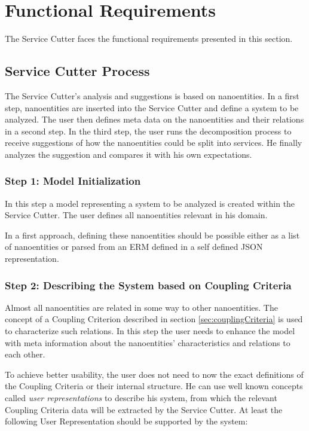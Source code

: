 \section{Functional Requirements}

The Service Cutter faces the functional requirements presented in this
section.


\subsection{Service Cutter Process}

The Service Cutter's analysis and suggestions is based on nanoentities. In a first step, nanoentities are inserted into the Service Cutter and define a system to be analyzed. The user then defines meta data on the nanoentities and their relations in a second step. In the third step, the user runs the decomposition process to receive suggestions of how the nanoentities could be split into services. He finally analyzes the suggestion and compares it with his own expectations. 

\subsubsection{Step 1: Model Initialization}

In this step a model representing a system to be analyzed is created within the Service Cutter. The user defines all nanoentities relevant in his domain. 

In a first approach, defining these nanoentities should be possible either as a list of nanoentities or parsed from an \gls{ERM} defined in a self defined JSON representation.

\subsubsection{Step 2: Describing the System based on Coupling Criteria}

Almost all nanoentities are related in some way to other nanoentities. The concept of a Coupling Criterion described in section \ref{sec:couplingCriteria} is used to characterize such relations. In this step the user needs to enhance the model with meta information about the nanoentities' characteristics and relations to each other. 

To achieve better usability, the user does not need to now the exact definitions of the Coupling Criteria or their internal structure. He can use well known concepts called \textit{user representations} to describe his system, from which the relevant Coupling Criteria data will be extracted by the Service Cutter. At least the following User Representation should be supported by the system:

